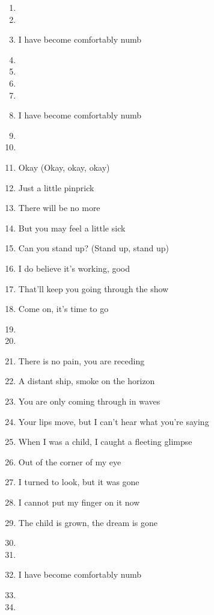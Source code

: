 \documentclass{article}
\begin{document}
\begin{enumerate}
        \item[]
        \item[] \chorus
        \item I have become comfortably numb

        \pagebreak

        \item[]
        \item[] \instrumental

        \item[]
        \item[] \chorus
        \item I have become comfortably numb

        \item[]
        \item[] 
        \item Okay (Okay, okay, okay)
        \item Just a little pinprick
        \item There will be no more
        \item But you may feel a little sick
        \item Can you stand up? (Stand up, stand up)
        \item I do believe it's working, good
        \item That'll keep you going through the show
        \item Come on, it's time to go

        \item[]
        \item[] 
        \item There is no pain, you are receding
        \item A distant ship, smoke on the horizon
        \item You are only coming through in waves
        \item Your lips move, but I can't hear what you're saying
        \item When I was a child, I caught a fleeting glimpse
        \item Out of the corner of my eye
        \item I turned to look, but it was gone
        \item I cannot put my finger on it now
        \item The child is grown, the dream is gone

        \item[]
        \item[] \chorus
        \item I have become comfortably numb

        \item[]
        \item[] \instrumental

    \end{enumerate}
\end{document}
